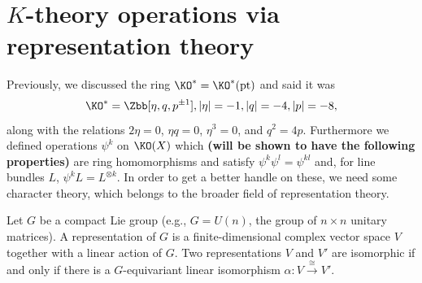 \fi
{}
\section{\texorpdfstring{$K$}{K}-theory operations via representation theory} %
\label{BuildingKtheoryOperatorsFromRepTheory}
\ifx\OutputBuildingKtheoryOperatorsFromRepTheory\undefined\else
Previously, we discussed the ring $\KO^* = \KO^*(\ptspace)$ and said it was
\[
\KO^* = \Zbb[\eta, q, p^{\pm 1}], |\eta| = -1, |q| = -4, |p| = -8
,\]
along with the relations $2 \eta = 0$, $\eta q = 0$, $\eta^3 = 0$, and $q^2 = 4p$.  Furthermore we defined operations $\psi^k$ on $\KO(X)$ which \textbf{(will be shown to have the following properties)} are ring homomorphisms and satisfy $\psi^k \psi^l = \psi^{kl}$ and, for line bundles $L$, $\psi^k L = L^{\otimes k}$.  In order to get a better handle on these, we need some character theory, which belongs to the broader field of representation theory.

Let $G$ be a compact Lie group (e.g., $G=U(n)$, the group of $n\times n$ unitary matrices).  A representation of $G$ is a finite-dimensional complex vector space $V$ together with a linear action of $G$.  Two representations $V$ and $V'$ are isomorphic if and only if there is a $G$-equivariant linear isomorphism $\alpha: V \xrightarrow{\cong} V'$.

